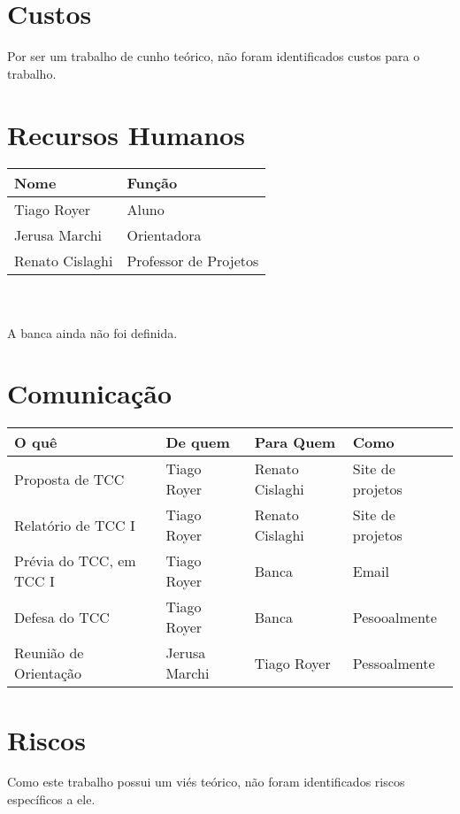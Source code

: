 \documentclass[12pt]{article}
\begin{document}
\section{Custos}
    Por ser um trabalho de cunho teórico, não foram identificados custos para o trabalho.

\section{Recursos Humanos}
    \begin{tabular}{l l}
        \hline
        Nome            & Função \\
        \hline
        Tiago Royer     & Aluno \\
        Jerusa Marchi   & Orientadora \\
        Renato Cislaghi & Professor de Projetos \\
        \hline
    \end{tabular}
    \\
    \\
    A banca ainda não foi definida.

\section{Comunicação}
    \begin{tabular}{l l l l}
        \hline
        O quê                   & De quem       & Para Quem         & Como \\
        \hline
        Proposta de TCC         & Tiago Royer   & Renato Cislaghi   & Site de projetos \\
        Relatório de TCC I      & Tiago Royer   & Renato Cislaghi   & Site de projetos \\
        Prévia do TCC, em TCC I & Tiago Royer   & Banca             & Email \\
        Defesa do TCC           & Tiago Royer   & Banca             & Pesooalmente \\
        Reunião de Orientação   & Jerusa Marchi & Tiago Royer       & Pessoalmente \\
        \hline
    \end{tabular}

\section{Riscos}
    Como este trabalho possui um viés teórico, não foram identificados
    riscos específicos a ele.



\end{document}
